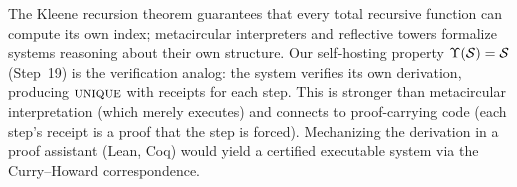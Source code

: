 The Kleene recursion theorem guarantees that every total recursive function
can compute its own index; metacircular interpreters and reflective towers
formalize systems reasoning about their own structure.  Our self-hosting
property $\Upsilon(\mathcal{S}) = \mathcal{S}$ (Step~19) is the verification analog:
the system verifies its own derivation, producing $\textsc{unique}$ with receipts
for each step.  This is stronger than metacircular interpretation (which
merely executes) and connects to proof-carrying code (each step's receipt
is a proof that the step is forced).  Mechanizing the derivation in a proof
assistant (Lean, Coq) would yield a certified executable system via the
Curry--Howard correspondence.
